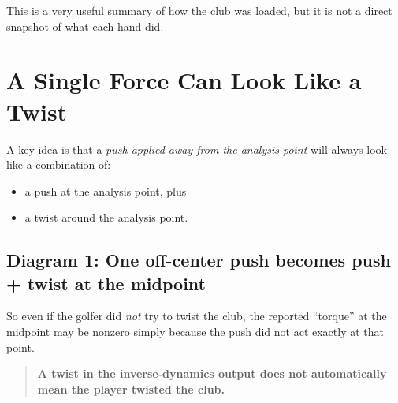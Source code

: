 \documentclass[12pt]{article}
\begin{document}
This is a very useful summary of how the club was loaded, but it is not a direct snapshot of what each hand did.

\section{A Single Force Can Look Like a Twist}

A key idea is that a \emph{push applied away from the analysis point} will always look like a combination of:
\begin{itemize}
    \item a push at the analysis point, plus
    \item a twist around the analysis point.
\end{itemize}

\subsection*{Diagram 1: One off-center push becomes push + twist at the midpoint}

\begin{center}
\end{center}

So even if the golfer did \emph{not} try to twist the club, the reported ``torque'' at the midpoint may be nonzero simply because the push did not act exactly at that point.

\begin{quote}
\textbf{A twist in the inverse-dynamics output does not automatically mean the player twisted the club.}
\end{quote}

\end{document}
